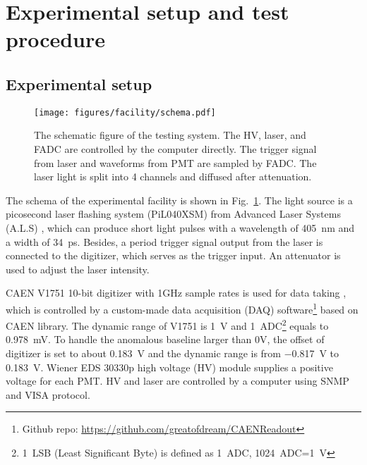 \section{Experimental setup and test procedure}
\label{SetUp}
\subsection{Experimental setup}
\label{sec:setup}
\begin{figure}[!htbp]
    \centering
    \texttt{[image: figures/facility/schema.pdf]}
    \caption{The schematic figure of the testing system. The HV, laser, and FADC are controlled by the computer directly. The trigger signal from laser and waveforms from PMT are sampled by FADC. The laser light is split into 4 channels and diffused after attenuation.}
    \label{fig:facility}
\end{figure}

The schema of the experimental facility is shown in Fig.~\ref{fig:facility}. The light source is a picosecond laser flashing system (PiL040XSM) from Advanced Laser Systems (A.L.S) \cite{NTKLaser}, which can produce short light pulses with a wavelength of \SI{405}{nm} and a width of \SI{34}{ps}. Besides, a period trigger signal output from the laser is connected to the digitizer, which serves as the trigger input. An attenuator is used to adjust the laser intensity.

CAEN V1751 10-bit digitizer with 1GHz sample rates is used for data taking \cite{CAENV1751}, which is controlled by a custom-made data acquisition (DAQ) software\footnote{Github repo: \url{https://github.com/greatofdream/CAENReadout}} based on CAEN library. The dynamic range of V1751 is \SI{1}{V} and \SI{1}{ADC}\footnote{\SI{1}{LSB} (Least Significant Byte) is defined as \SI{1}{ADC}, \SI{1024}{ADC}=\SI{1}{V}} equals to \SI{0.978}{mV}. To handle the anomalous baseline larger than 0V, the offset of digitizer is set to about \SI{0.183}{V} and the dynamic range is from \SI{-0.817}{V} to \SI{0.183}{V}. Wiener EDS 30330p high voltage (HV) module \cite{WIENERHV} supplies a positive voltage for each PMT. HV and laser are controlled by a computer using SNMP \cite{SNMP} and VISA \cite{VISA} protocol.

